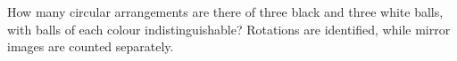 How many circular arrangements are there of three black and three white balls, with balls of each colour indistinguishable? Rotations are identified, while mirror images are counted separately.
